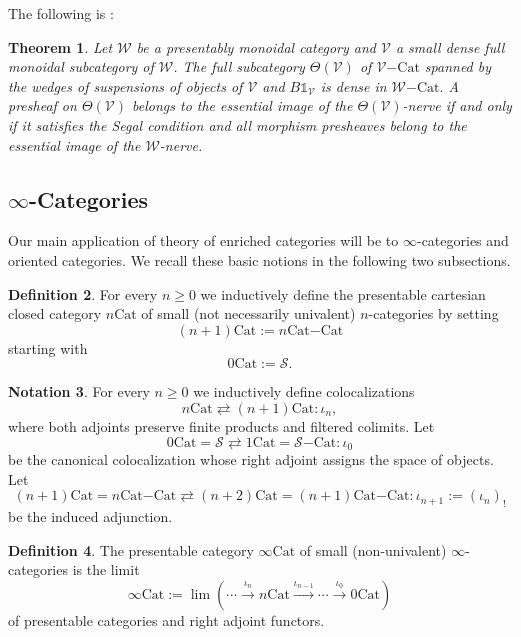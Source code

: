 \documentclass[10pt,oneside]{article}
\numberwithin{equation}{section} %
\numberwithin{figure}{section} %
\theoremstyle{plain}
\newtheorem{theorem}{Theorem}[subsection]
\theoremstyle{definition}
\newtheorem{definition}[theorem]{Definition}
\newtheorem{notation}[theorem]{Notation}
\newcommand{\mS}{{\mathcal S}}
\newcommand{\mV}{{\mathcal V}}
\newcommand{\mW}{{\mathcal W}}
\newcommand{\n}{{n}}
\newcommand{\Cat}{\mathrm{Cat}}
\newcommand{\tu}{{\mathbb 1}}
\begin{document}
The following is \cite[Theorem 2.4.8.]{oriented}:

\begin{theorem}\label{denseinherited} Let $\mW$ be a presentably monoidal category and $\mV$ a small dense full monoidal subcategory of $\mW$.
The full subcategory $\Theta(\mV)$ of $\mV\mathrm{-}\Cat$ spanned by the wedges of suspensions of objects of $\mV$ and $B\tu_\mV$ is dense in $\mW\mathrm{-}\Cat.$
A presheaf on $\Theta(\mV) $ belongs to the essential image of the $\Theta(\mV)$-nerve
if and only if it satisfies the Segal condition and 
all morphism presheaves belong to the essential image of the $\mW$-nerve.

\end{theorem}


\subsection{$\infty$-Categories}
Our main application of theory of enriched categories will be to $\infty$-categories and oriented categories.
We recall these basic notions in the following two subsections.

\begin{definition}
For every $\n \geq 0$ we inductively define the presentable cartesian closed category $\n\Cat$ of small (not necessarily univalent) $\n$-categories by setting
$$(\n+1)\Cat:= {{\n\Cat}\mathrm{-}\Cat} $$
starting with $$ 0\Cat :=\mS.$$
\end{definition}

\begin{notation}
For every $\n \geq 0$ we inductively define colocalizations
$$\n\Cat \rightleftarrows (\n+1)\Cat: \iota_\n,$$
where both adjoints  preserve finite products and filtered colimits.
Let
$$0\Cat= \mS \rightleftarrows 1\Cat = {\mS\mathrm{-}\Cat} : \iota_0 $$ be the canonical colocalization whose right adjoint assigns the space of objects. Let $$(\n+1)\Cat= {{\n\Cat}\mathrm{-}\Cat} \rightleftarrows (\n+2)\Cat= {{(\n+1)\Cat}\mathrm{-}\Cat}:\iota_{\n+1}:= (\iota_\n)_! $$
be the induced adjunction.	
	
\end{notation}

\begin{definition}The presentable category $\infty\Cat$ of small (non-univalent) $\infty$-categories is the limit
$$\infty\Cat:= \lim(\cdots\xrightarrow{\iota_{\n}} \n \Cat \xrightarrow{\iota_{\n-1}}\cdots \xrightarrow{\iota_0} 0 \Cat) $$
of presentable categories and right adjoint functors.

\end{definition}
\end{document}
